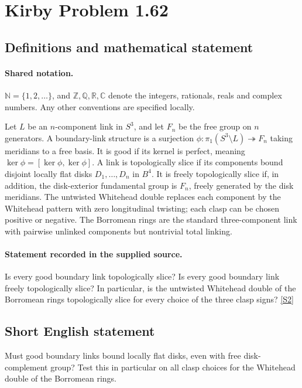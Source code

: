 \documentclass[11pt]{article}
\newcommand{\sref}[2]{\hyperlink{source:#1:#2}{[S#2]}}
\begin{document}
\section{Kirby Problem 1.62}\label{statement}

\subsection{Definitions and mathematical statement}

\paragraph{Shared notation.}$\mathbb N=\{1,2,\ldots\}$, and $\mathbb Z,\mathbb Q,\mathbb R,\mathbb C$ denote the integers, rationals, reals and complex numbers. Any other conventions are specified locally.


Let $L$ be an $n$-component link in $S^3$, and let $F_n$ be the free group on $n$ generators. A boundary-link structure is a surjection $\phi:\pi_1(S^3\setminus L)\twoheadrightarrow F_n$ taking meridians to a free basis. It is good if its kernel is perfect, meaning $\ker\phi=[\ker\phi,\ker\phi]$. A link is topologically slice if its components bound disjoint locally flat disks $D_1,\ldots,D_n$ in $B^4$. It is freely topologically slice if, in addition, the disk-exterior fundamental group is $F_n$, freely generated by the disk meridians. The untwisted Whitehead double replaces each component by the Whitehead pattern with zero longitudinal twisting; each clasp can be chosen positive or negative. The Borromean rings are the standard three-component link with pairwise unlinked components but nontrivial total linking.
\paragraph{Statement recorded in the supplied source.}
Is every good boundary link topologically slice? Is every good boundary link freely topologically slice? In particular, is the untwisted Whitehead double of the Borromean rings topologically slice for every choice of the three clasp signs? \sref{statement}{2}

\subsection{Short English statement}
Must good boundary links bound locally flat disks, even with free disk-complement group? Test this in particular on all clasp choices for the Whitehead double of the Borromean rings.
\end{document}
